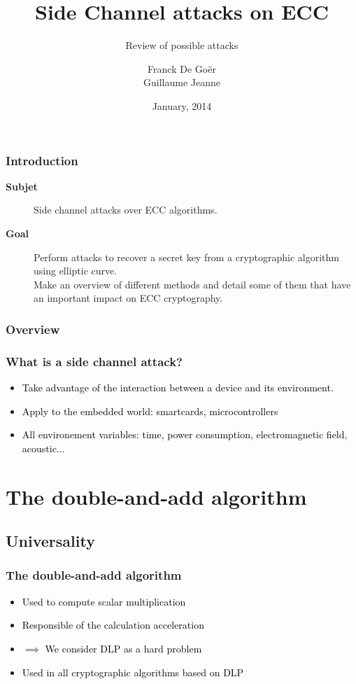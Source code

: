 \documentclass{beamer}
\title[ECC Side channel attacks]{Side Channel attacks on ECC}
\subtitle{Review of possible attacks}
\author{Franck De Goër\\Guillaume Jeanne}
\institute{SCCI - Ensimag}
\date{January, 2014}
\begin{document}
\begin{frame}
    \titlepage
\end{frame}

\begin{frame}[t]
    \frametitle{Introduction}
    \vspace{1cm}
    \begin{description}
        \item[{\bf Subjet}] Side channel attacks over ECC algorithms.
        \item[{\bf Goal}] Perform attacks to recover a secret key from a cryptographic algorithm using elliptic curve. \\
	Make an overview of different methods and detail some of them that have an important impact on ECC cryptography.
	
    \end{description}
\end{frame}

\begin{frame}
    \frametitle{Overview}
    \tableofcontents
\end{frame}

\begin{frame}
    \frametitle{What is a side channel attack?}
    \begin{itemize}
        \item \textcolor{black} {Take advantage of the interaction between a device and its environment.}
        \item \textcolor{black} {Apply to the embedded world: smartcards, microcontrollers}
	\item \textcolor{black} {All environement variables: time, power consumption, electromagnetic field, acoustic...}
    \end{itemize}

\end{frame}


\section{The double-and-add algorithm}
    \subsection{Universality}

\begin{frame}
    \frametitle{The double-and-add algorithm}
    \begin{itemize}
        \item \textcolor{black} {Used to compute scalar multiplication}
        \item \textcolor{black} {Responsible of the calculation acceleration}
	\item \textcolor{black} {$\implies$ We consider DLP as a hard problem}
	\item \textcolor{black} {Used in all cryptographic algorithms based on DLP}
    \end{itemize}

\end{frame}
\end{document}

